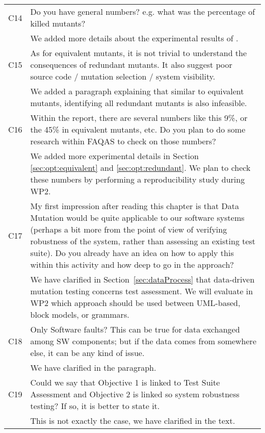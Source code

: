 \begin{longtable}{|p{1.2cm}|p{12cm}|@{}}
\begin{minipage}{10cm}
\end{minipage}
\\
\hline
C14&
Do you have general numbers? e.g. what was the percentage of killed mutants?
\\
\cmidrule{2-2}
&
We added more details about the experimental results of \cite{schuler2013covering}.
\\
\hline
C15&
As for equivalent mutants, it is not trivial to understand the consequences of redundant mutants. It also suggest poor source code / mutation selection /
system visibility.
\\
\cmidrule{2-2}
&
We added a paragraph explaining that similar to equivalent mutants, identifying all redundant mutants is also infeasible.
\\
\hline
C16&
Within the report, there are several numbers like this 9\%, or the 45\% in equivalent mutants, etc. Do you plan to do some research within FAQAS to check
on those numbers?
\\
\cmidrule{2-2}
&
We added more experimental details in Section \ref{sec:opt:equivalent} and \ref{sec:opt:redundant}. We plan to check these numbers by performing a reproducibility study during WP2.
\\

\hline
C17&
My first impression after reading this chapter is that Data Mutation would be quite applicable to our software systems (perhaps a bit more from the point of
view of verifying robustness of the system, rather than assessing an existing test suite).
Do you already have an idea on how to apply this within this activity and how deep to go in the approach?
\\
\cmidrule{2-2}
&
We have clarified in Section~\ref{sec:dataProcess} that data-driven mutation testing concerns test assessment. We will evaluate in WP2 which approach should be used between UML-based, block models, or grammars.

\\

\hline
C18&
Only Software faults? This can be true for data exchanged among SW components; but if the data comes from somewhere else, it can be any kind of
issue.
\\
\cmidrule{2-2}
&We have clarified in the paragraph.
\\
\hline
C19&
Could we say that Objective 1 is linked to Test Suite Assessment and Objective 2 is linked so system robustness testing? If so, it is better to state it.
\\
\cmidrule{2-2}
&This is not exactly the case, we have clarified in the text.
\\


\end{longtable}
